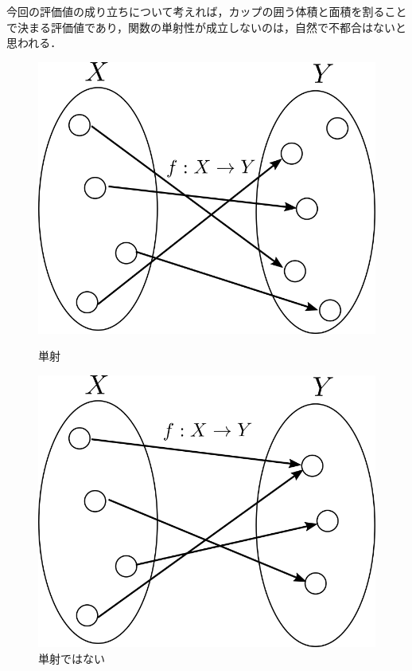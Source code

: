 \documentclass[16.7pt]{jsarticle}
\begin{document}
		今回の評価値の成り立ちについて考えれば，カップの囲う体積と面積を割ることで決まる評価値であり，関数の単射性が成立しないのは，自然で不都合はないと思われる．
		\begin{figure}[h]
			\centering
			\begin{minipage}{0.45\hsize}
				\centering
				\includegraphics[width= 0.65\columnwidth]{./figure/Injection.png}
				\caption{単射}
			\end{minipage}
			\begin{minipage}{0.45\hsize}
				\centering
				\includegraphics[width= 0.65\columnwidth]{./figure/Surjection.png}
				\caption{単射ではない}
			\end{minipage}
		\end{figure}
		
\end{document}

